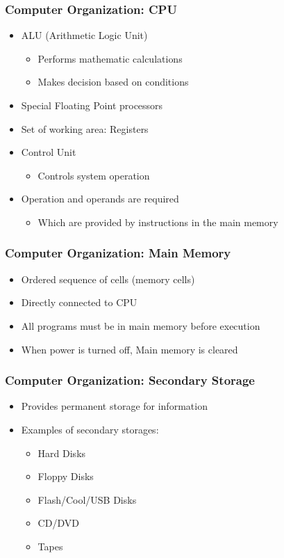 \documentclass{../c-lecture}
\begin{document}
\begin{frame}
  \frametitle{Computer Organization: CPU}
  \begin{itemize}
    \item ALU (Arithmetic Logic Unit)
    \begin{itemize}
      \item Performs mathematic calculations
      \item Makes decision based on conditions
    \end{itemize}
    \item Special Floating Point processors
    \item Set of working area: Registers
    \item Control Unit
    \begin{itemize}
      \item Controls system operation
    \end{itemize}
    \item Operation and operands are required
    \begin{itemize}
      \item Which are provided by instructions in the main memory
    \end{itemize}
  \end{itemize}
\end{frame}

\begin{frame}
  \frametitle{Computer Organization: Main Memory}
  \begin{itemize}
    \item Ordered sequence of cells (memory cells)
    \item Directly connected to CPU
    \item All programs must be in main memory before execution
    \item When power is turned off, Main memory is cleared
  \end{itemize}
\end{frame}

\begin{frame}
  \frametitle{Computer Organization: Secondary Storage}
  \begin{itemize}
    \item Provides permanent storage for information
    \item Examples of secondary storages:
    \begin{itemize}
      \item Hard Disks
      \item Floppy Disks
      \item Flash/Cool/USB Disks
      \item CD/DVD
      \item Tapes
    \end{itemize}
  \end{itemize}
\end{frame}
\end{document}
